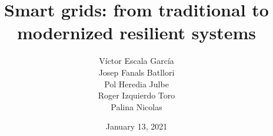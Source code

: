 \documentclass[aspectratio=169]{beamer} %
\title{Smart grids: from traditional to modernized resilient systems}
\institute{\large{\textbf{Smart Grids}}}
\date{January 13, 2021}
\author[Group 2]{
	Víctor Escala García \\
	Josep Fanals Batllori \\
	Pol Heredia Julbe \\
	Roger Izquierdo Toro \\
	Palina Nicolas \\
}
\begin{document}
\begin{frame}[plain]
\hspace*{-1.0cm}\parbox[t]{\textwidth}{
	\titlepage
    } 
\end{frame}

\begin{frame}
	\footnotesize
	\tableofcontents
\end{frame}


% 



\begin{frame}[plain]
\hspace*{-1.0cm}\parbox[t]{\textwidth}{
	\titlepage
    } 
\end{frame}
\end{document}
